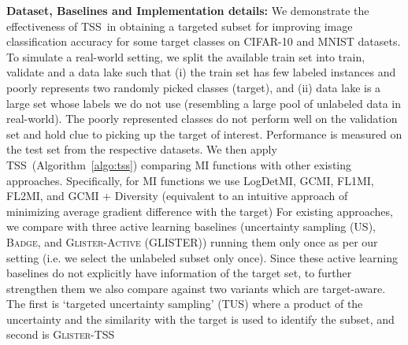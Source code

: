 \documentclass{article}
\newcommand{\modelss}{\mbox{\textsc{TSS}}}
\begin{document}
\textbf{Dataset, Baselines and Implementation details: } %
We demonstrate the effectiveness of \modelss\ in obtaining a targeted subset for improving image classification accuracy for some target classes on CIFAR-10 and MNIST datasets. To simulate a real-world setting, %
we split the available train set into train, validate and a data lake such that (i) the train set has few labeled instances and poorly represents two randomly picked classes (target), and (ii) data lake is a large set whose labels we do not use (resembling a large pool of unlabeled data in real-world). The poorly represented classes do not perform well on the validation set and hold clue to picking up the target of interest. Performance is measured on the test set from the respective datasets. We then apply \modelss\ (Algorithm~\ref{algo:tss}) comparing MI functions with other existing approaches. Specifically, for MI functions we use LogDetMI, GCMI, FL1MI, FL2MI, and GCMI + Diversity (equivalent to an intuitive approach of minimizing average gradient difference with the target)
For existing approaches, we compare with three active learning baselines (uncertainty sampling (US), \textsc{Badge}, and \textsc{Glister-Active} (GLISTER)) running them only once as per our setting (i.e. we select the unlabeled subset only once). Since these active learning baselines do not explicitly have information of the target set, to further strengthen them we also compare against two variants which are target-aware. The first is `targeted uncertainty sampling' (TUS) where a product of the uncertainty and the similarity with the target is used to identify the subset, and second is \textsc{Glister-TSS}
\end{document}
